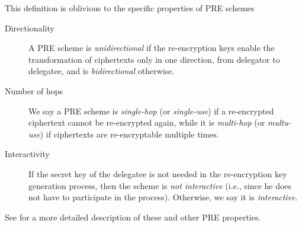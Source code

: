 \documentclass{amsart}
\begin{document}
This definition is oblivious to the specific properties of PRE schemes \cite{nunez2015parametric} 

\begin{description}
\item[Directionality] A PRE scheme is \emph{unidirectional} if the re-encryption keys enable the transformation of ciphertexts only in one direction, from delegator to delegatee, and is \emph{bidirectional} otherwise. 
\item[Number of hops] We say a PRE scheme is \emph{single-hop} (or \emph{single-use}) if a re-encrypted ciphertext cannot be re-encrypted again, while it is \emph{multi-hop} (or \emph{multu-use})  if ciphertexts are re-encryptable multiple times. 
\item[Interactivity] If the secret key of the delegatee is not needed in the re-encryption key generation process, then the scheme is \emph{not interactive} (i.e., since he does not have to participate in the process). Otherwise, we say it is \emph{interactive}. 
\end{description}

See \cite[Section 3.3]{nunez2017proxy} for a more detailed description of these and other PRE properties. 
\end{document}
